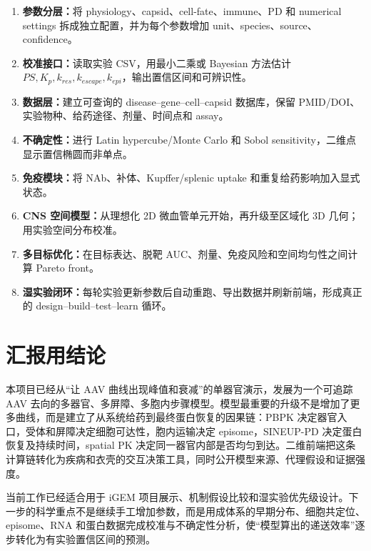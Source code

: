 \documentclass[UTF8,11pt,a4paper]{ctexart}
\begin{document}
\begin{enumerate}
  \item \textbf{参数分层：}将 physiology、capsid、cell-fate、immune、PD 和 numerical settings 拆成独立配置，并为每个参数增加 unit、species、source、confidence。
  \item \textbf{校准接口：}读取实验 CSV，用最小二乘或 Bayesian 方法估计 $PS,K_p,k_{res},k_{escape},k_{epi}$，输出置信区间和可辨识性。
  \item \textbf{数据层：}建立可查询的 disease--gene--cell--capsid 数据库，保留 PMID/DOI、实验物种、给药途径、剂量、时间点和 assay。
  \item \textbf{不确定性：}进行 Latin hypercube/Monte Carlo 和 Sobol sensitivity，二维点显示置信椭圆而非单点。
  \item \textbf{免疫模块：}将 NAb、补体、Kupffer/splenic uptake 和重复给药影响加入显式状态。
  \item \textbf{CNS 空间模型：}从理想化 2D 微血管单元开始，再升级至区域化 3D 几何；用实验空间分布校准。
  \item \textbf{多目标优化：}在目标表达、脱靶 AUC、剂量、免疫风险和空间均匀性之间计算 Pareto front。
  \item \textbf{湿实验闭环：}每轮实验更新参数后自动重跑、导出数据并刷新前端，形成真正的 design--build--test--learn 循环。
\end{enumerate}

\section{汇报用结论}

本项目已经从“让 AAV 曲线出现峰值和衰减”的单器官演示，发展为一个可追踪 AAV 去向的多器官、多屏障、多胞内步骤模型。模型最重要的升级不是增加了更多曲线，而是建立了从系统给药到最终蛋白恢复的因果链：PBPK 决定器官入口，受体和屏障决定细胞可达性，胞内运输决定 episome，SINEUP-PD 决定蛋白恢复及持续时间，spatial PK 决定同一器官内部是否均匀到达。二维前端把这条计算链转化为疾病和衣壳的交互决策工具，同时公开模型来源、代理假设和证据强度。

当前工作已经适合用于 iGEM 项目展示、机制假设比较和湿实验优先级设计。下一步的科学重点不是继续手工增加参数，而是用成体系的早期分布、细胞共定位、episome、RNA 和蛋白数据完成校准与不确定性分析，使“模型算出的递送效率”逐步转化为有实验置信区间的预测。
\end{document}

